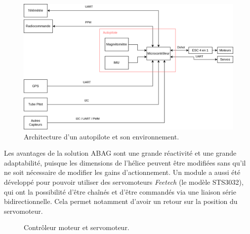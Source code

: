 \begin{figure}[ht!]
    \centerline{
    \includegraphics[trim=0cm 0cm 0cm 0cm,clip,width=0.9\columnwidth]{figures/arch_materiel.png}}
    \caption{Architecture d'un autopilote et son environnement.}
    \label{fig:schemaComposent}
\end{figure}

Les avantages de la solution ABAG sont une grande réactivité et une grande adaptabilité, puisque les dimensions de l'hélice peuvent être modifiées sans qu'il ne soit nécessaire de modifier les gains d'actionnement.
Un module a aussi été développé pour pouvoir utiliser des servomoteurs \textit{Feetech} (le modèle STS3032), qui ont la possibilité d'être chaînés et d'être commandés via une liaison série bidirectionnelle. Cela permet notamment d'avoir un retour sur la position du servomoteur.

\begin{figure}[ht!]
    \centering
    \caption{Contrôleur moteur et servomoteur.}
    \label{fig:ESCServo}
\end{figure}





